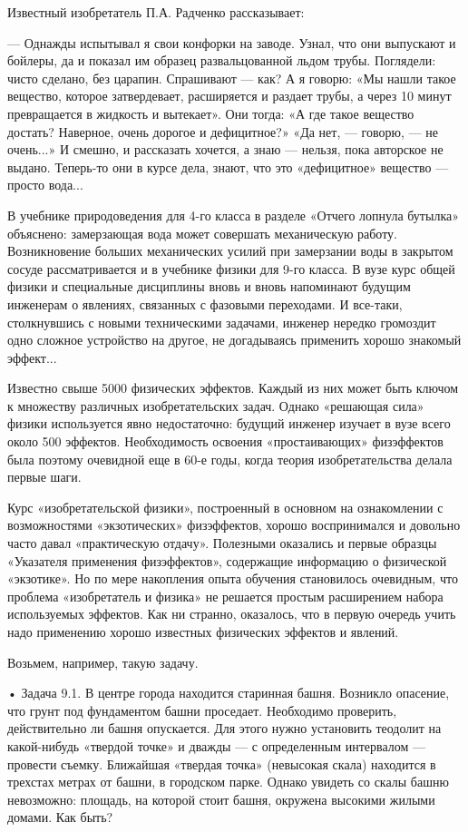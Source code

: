 Известный изобретатель П.А. Радченко рассказывает:

—  Однажды  испытывал  я  свои  конфорки на  заводе.  Узнал,  что  они
выпускают и  бойлеры, да  и показал  им образец  развальцованной льдом
трубы. Поглядели:  чисто сделано, без  царапин. Спрашивают — как?  А я
говорю: «Мы нашли такое  вещество, которое затвердевает, расширяется и
раздает трубы, а  через 10 минут превращается в  жидкость и вытекает».
Они тогда:  «А где такое  вещество достать? Наверное, очень  дорогое и
дефицитное?» «Да нет, — говорю, —  не очень...» И смешно, и рассказать
хочется, а  знаю — нельзя, пока  авторское не выдано. Теперь-то  они в
курсе дела, знают, что это «дефицитное» вещество — просто вода...

В учебнике  природоведения для 4-го  класса в разделе  «Отчего лопнула
бутылка»  объяснено:  замерзающая  вода может  совершать  механическую
работу. Возникновение больших механических  усилий при замерзании воды
в  закрытом  сосуде  рассматривается  и в  учебнике  физики  для  9-го
класса.  В вузе  курс общей  физики и  специальные дисциплины  вновь и
вновь напоминают  будущим инженерам  о явлениях, связанных  с фазовыми
переходами. И  все-таки, столкнувшись с новыми  техническими задачами,
инженер  нередко  громоздит  одно  сложное устройство  на  другое,  не
догадываясь применить хорошо знакомый эффект...

Известно  свыше 5000  физических эффектов.  Каждый из  них может  быть
ключом к множеству различных  изобретательских задач. Однако «решающая
сила» физики используется явно недостаточно: будущий инженер изучает в
вузе всего около 500  эффектов. Необходимость освоения «простаивающих»
физэффектов  была поэтому  очевидной  еще в  60-е  годы, когда  теория
изобретательства делала первые шаги.

Курс «изобретательской физики», построенный в основном на ознакомлении
с  возможностями «экзотических»  физэффектов,  хорошо воспринимался  и
довольно  часто  давал   «практическую  отдачу».  Полезными  оказались
и  первые  образцы   «Указателя  применения  физэффектов»,  содержащие
информацию  о  физической  «экзотике».  Но по  мере  накопления  опыта
обучения становилось  очевидным, что проблема «изобретатель  и физика»
не решается  простым расширением набора используемых  эффектов. Как ни
странно, оказалось, что в первую  очередь учить надо применению хорошо
известных физических эффектов и явлений.

Возьмем, например, такую задачу.

•  Задача 9.1.  В центре  города находится  старинная башня.  Возникло
опасение,  что  грунт  под  фундаментом  башни  проседает.  Необходимо
проверить,  действительно   ли  башня  опускается.  Для   этого  нужно
установить  теодолит на  какой-нибудь  «твердой точке»  и  дважды —  с
определенным интервалом  — провести съемку. Ближайшая  «твердая точка»
(невысокая скала)  находится в трехстах  метрах от башни,  в городском
парке. Однако увидеть  со скалы башню невозможно:  площадь, на которой
стоит башня, окружена высокими жилыми домами. Как быть?

